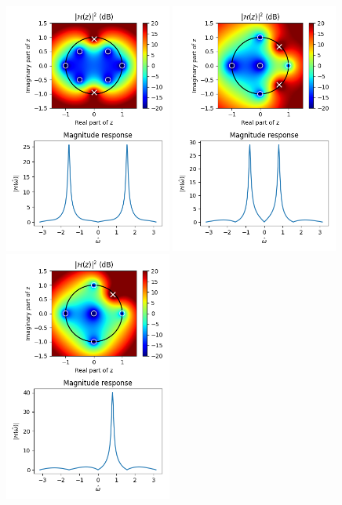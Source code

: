 \begin{figure}
\begin{center}
\includegraphics[width=0.49\textwidth]{code/026_iir/ex5.png}
\includegraphics[width=0.49\textwidth]{code/026_iir/ex6.png}
\includegraphics[width=0.49\textwidth]{code/026_iir/ex7.png}

\end{center}
\end{figure}
